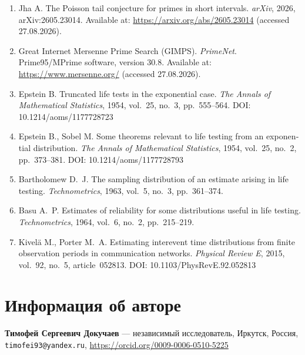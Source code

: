 \documentclass[11pt,a4paper]{article}
\theoremstyle{plain}
\theoremstyle{remark}
\begin{document}
\begin{otherlanguage}{english}
\begin{enumerate}
\item Jha A. The Poisson tail conjecture for primes in short intervals.
\emph{arXiv}, 2026, arXiv:2605.23014. Available at:
\url{https://arxiv.org/abs/2605.23014} (accessed 27.08.2026).

\item Great Internet Mersenne Prime Search (GIMPS). \emph{PrimeNet}.
Prime95/MPrime software, version 30.8. Available at:
\url{https://www.mersenne.org/} (accessed 27.08.2026).

\item Epstein B. Truncated life tests in the exponential case.
\emph{The Annals of Mathematical Statistics}, 1954, vol.~25, no.~3,
pp.~555--564. DOI: 10.1214/aoms/1177728723

\item Epstein B., Sobel M. Some theorems relevant to life testing from an
exponential distribution. \emph{The Annals of Mathematical Statistics}, 1954,
vol.~25, no.~2, pp.~373--381. DOI: 10.1214/aoms/1177728793

\item Bartholomew D.~J. The sampling distribution of an estimate arising in
life testing. \emph{Technometrics}, 1963, vol.~5, no.~3, pp.~361--374.

\item Basu A.~P. Estimates of reliability for some distributions useful in
life testing. \emph{Technometrics}, 1964, vol.~6, no.~2, pp.~215--219.

\item Kivel\"{a} M., Porter M.~A. Estimating interevent time distributions
from finite observation periods in communication networks.
\emph{Physical Review E}, 2015, vol.~92, no.~5, article~052813.
DOI: 10.1103/PhysRevE.92.052813
\end{enumerate}
\end{otherlanguage}

\section*{Информация об авторе}
\noindent\textbf{Тимофей Сергеевич Докучаев} ---
независимый исследователь, Иркутск, Россия,
\texttt{timofei93@yandex.ru}, \url{https://orcid.org/0009-0006-0510-5225}
\end{document}

